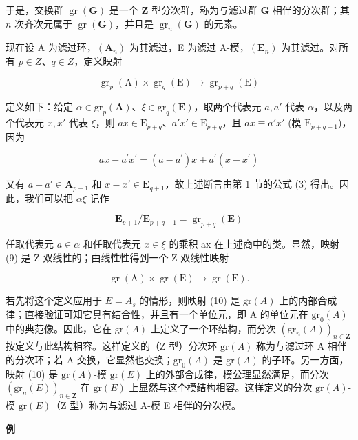 	于是，交换群 \(\operatorname{gr}(\mathbf{G})\) 是一个 \(\mathbf{Z}\) 型分次群，称为与滤过群 \(\mathbf{G}\) 相伴的分次群；其 \(n\) 次齐次元属于 \(\operatorname{gr}(\mathbf{G})\)，并且是 \(\operatorname{gr}_n(\mathbf{G})\) 的元素。

现在设 A 为滤过环，\((\mathbf{A}_{n})\) 为其滤过，E 为滤过 A-模，\((\mathbf{E}_{n})\) 为其滤过。对所有 \(p \in Z\)、\(q \in Z\)，定义映射

\[
\operatorname{gr} _ {p} (\mathrm{A}) \times \operatorname{gr} _ {q} (\mathrm{E}) \rightarrow \operatorname{gr} _ {p + q} (\mathrm{E})\tag{9}
\]

	定义如下：给定 \(\alpha \in \mathrm{gr}_p(\mathbf{A})\)、\(\xi \in \mathrm{gr}_q(\mathbf{E})\)，取两个代表元 \(a, a'\) 代表 \(\alpha\)，以及两个代表元 \(x, x'\) 代表 \(\xi\)，则 \(ax \in \mathrm{E}_{p + q}\)、\(a'x' \in \mathrm{E}_{p + q}\)，且 \(ax \equiv a'x'\) (模 \(\mathrm{E}_{p + q + 1}\))，因为

\[
a x - a ^ {\prime} x ^ {\prime} = (a - a ^ {\prime}) x + a ^ {\prime} (x - x ^ {\prime})
\]

	又有 \(a - a' \in \mathbf{A}_{p+1}\) 和 \(x - x' \in \mathbf{E}_{q+1}\)，故上述断言由第 1 节的公式 (3) 得出。因此，我们可以把 \(\alpha\xi\) 记作

\[
\mathbf {E} _ {p + 1} / \mathbf {E} _ {p + q + 1} = \operatorname{gr} _ {p + q} (\mathbf {E})
\]

	任取代表元 \(a \in \alpha\) 和任取代表元 \(x \in \xi\) 的乘积 ax 在上述商中的类。显然，映射 (9) 是 Z-双线性的；由线性性得到一个 Z-双线性映射

\[
\operatorname{gr} (\mathrm{A}) \times \operatorname{gr} (\mathrm{E}) \rightarrow \operatorname{gr} (\mathrm{E}).\tag{10}
\]

	若先将这个定义应用于 \(E = A_{s}\) 的情形，则映射 (10) 是 \(\mathrm{gr}(A)\) 上的内部合成律；直接验证可知它具有结合性，并且有一个单位元，即 A 的单位元在 \(\mathrm{gr}_{0}(A)\) 中的典范像。因此，它在 \(\mathrm{gr}(A)\) 上定义了一个环结构，而分次 \((\mathrm{gr}_{n}(A))_{n\in\mathbf{Z}}\) 按定义与此结构相容。这样定义的（Z 型）分次环 \(\mathrm{gr}(A)\) 称为与滤过环 A 相伴的分次环；若 A 交换，它显然也交换；\(\mathrm{gr}_{0}(A)\) 是 \(\mathrm{gr}(A)\) 的子环。另一方面，映射 (10) 是 \(\mathrm{gr}(A)\)-模 \(\mathrm{gr}(E)\) 上的外部合成律，模公理显然满足，而分次 \((\mathrm{gr}_{n}(E))_{n\in\mathbf{Z}}\) 在 \(\mathrm{gr}(E)\) 上显然与这个模结构相容。这样定义的分次 \(\mathrm{gr}(A)\)-模 \(\mathrm{gr}(E)\)（Z 型）称为与滤过 A-模 E 相伴的分次模。

\textbf{例}\par

